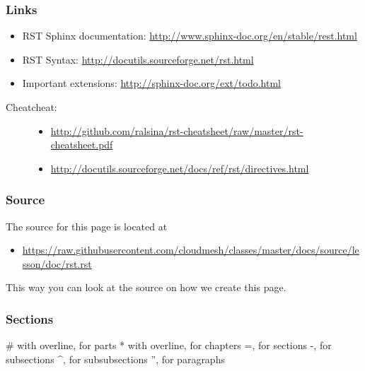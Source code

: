 \subsubsection{Links}
\label{\detokenize{lesson/doc/rst:links}}\begin{itemize}
\item {} 
RST Sphinx documentation: \url{http://www.sphinx-doc.org/en/stable/rest.html}

\item {} 
RST Syntax: \url{http://docutils.sourceforge.net/rst.html}

\item {} 
Important extensions: \url{http://sphinx-doc.org/ext/todo.html}

\end{itemize}
\begin{description}
\item[{Cheatcheat:}] \leavevmode\begin{itemize}
\item {} 
\url{http://github.com/ralsina/rst-cheatsheet/raw/master/rst-cheatsheet.pdf}

\item {} 
\url{http://docutils.sourceforge.net/docs/ref/rst/directives.html}

\end{itemize}

\end{description}


\subsubsection{Source}
\label{\detokenize{lesson/doc/rst:source}}
The source for this page is located at
\begin{itemize}
\item {} 
\url{https://raw.githubusercontent.com/cloudmesh/classes/master/docs/source/lesson/doc/rst.rst}

\end{itemize}

This way you can look at the source on how we create this page.


\subsubsection{Sections}
\label{\detokenize{lesson/doc/rst:sections}}
\# with overline, for parts
* with overline, for chapters
=, for sections
-, for subsections
\textasciicircum{}, for subsubsections
'', for paragraphs

